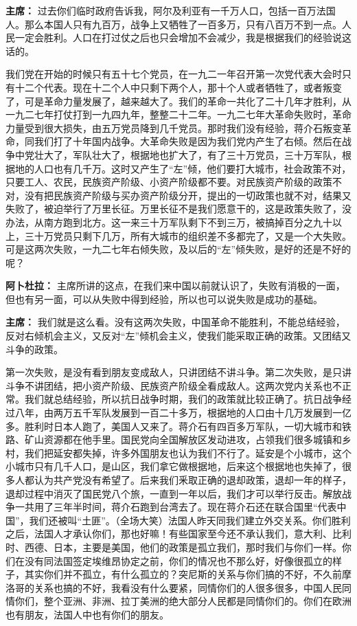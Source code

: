 \begin{duihua}
\item[\textbf{主席：}] 过去你们临时政府告诉我，阿尔及利亚有一千万人口，包括一百万法国人。那么本国人只有九百万，战争上又牺牲了一百多万，只有八百万不到一点。人民一定会胜利。人口在打过仗之后也只会增加不会减少，我是根据我们的经验说这话的。

我们党在开始的时候只有五十七个党员，在一九二一年召开第一次党代表大会时只有十二个代表。现在十二个人中只剩下两个人，那十个人或者牺牲了，或者叛变了，可是革命力量发展了，越来越大了。我们的革命一共化了二十几年才胜利，从一九二七年打仗打到一九四九年，整整二十二年。一九二七年大革命失败时，革命力量受到很大损失，由五万党员降到几千党员。那时我们没有经验，蒋介石叛变革命，同我们打了十年国内战争。大革命失败是因为我们党内产生了右倾。然后在战争中党壮大了，军队壮大了，根据地也扩大了，有了三十万党员，三十万军队，根据地的人口也有几千万。这时又产生了“左”倾，他们要打大城市，社会政策不对，只要工人、农民，民族资产阶级、小资产阶级都不要。对民族资产阶级的政策不对，没有把民族资产阶级与买办资产阶级分开，提出的一切政策也就不对，结果又失败了，被迫举行了万里长征。万里长征不是我们愿意干的，这是政策失败了，没办法，从南方跑到北方。这一来三十万军队剩下不到三万，被搞掉百分之九十以上，三十万党员只剩下几万，所有大城市的组织差不多都完了，又是一个大失败。可是这两次失败，一九二七年右倾失败，及以后的“左”倾失败，是好的还是不好的呢？

\item[\textbf{阿卜杜拉：}] 主席所讲的这点，在我们来中国以前就认识了，失败有消极的一面，但也有另一面，可以从失败中得到经验，所以也可以说失败是成功的基础。

\item[\textbf{主席：}] 我们就是这么看。没有这两次失败，中国革命不能胜利，不能总结经验，反对右倾机会主义，又反对“左”倾机会主义，使我们能采取正确的政策。又团结又斗争的政策。

第一次失败，是没有看到朋友变成敌人，只讲团结不讲斗争。第二次失败，是只讲斗争不讲团结，把小资产阶级、民族资产阶级全看成敌人。这两次党内关系也不正常。我们就总结经验，所以抗日战争时期，我们的政策就比较正确了。抗日战争经过八年，由两万五千军队发展到一百二十多万，根据地的人口由十几万发展到一亿多。胜利时日本人跑了，美国人又来了。蒋介石有四百多万军队，一切大城市和铁路、矿山资源都在他手里。国民党向全国解放区发动进攻，占领我们很多城镇和乡村，我们把延安都失掉，许多外国朋友也认为我们不行了。延安是个小城市，这个小城市只有几千人口，是山区，我们拿它做根据地，后来这个根据地也失掉了，很多人都认为共产党没有希望了。后来我们釆取正确的退却政策，退却一年的样子，退却过程中消灭了国民党八个旅，一直到一年以后，我们才可以举行反击。解放战争一共用了三年半时间，蒋介石跑到台湾去了。现在蒋介石还在联合国里“代表中国”，我们还被叫“土匪”。（全场大笑）法国人昨天同我们建立外交关系。你们胜利之后，法国人才承认你们，那也好嘛！有些国家至今还不承认我们，意大利、比利时、西德、日本，主要是美国，他们的政策是孤立我们，那时我们与你们一样。你们在没有同法国签定埃维昂协定之前，你们的情况也不那么好，好像很孤立的样子，其实你们并不孤立，有什么孤立的？突尼斯的关系与你们搞的不好，不久前摩洛哥的关系也搞的不好，我看没有什么要紧，同情你们的人很多很多，中国人民同情你们，整个亚洲、非洲、拉丁美洲的绝大部分人民都是同情你们的。你们在欧洲也有朋友，法国人中也有你们的朋友。


\end{duihua}
